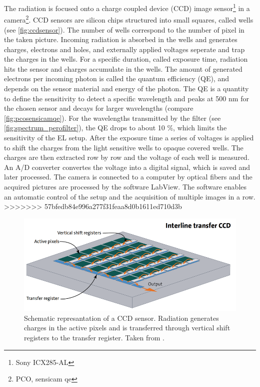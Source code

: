 The radiation is focused onto a charge coupled device (CCD) image sensor\footnote{Sony ICX285-AL} in a camera\footnote{PCO, sensicam qe}. CCD sensors are silicon chips structured into small squares, called wells \cite{SchnellCCD1993}(see \autoref{fig:ccdsensor}). The number of wells correspond to the number of pixel in the taken picture. Incoming radiation is absorbed in the wells and  generates charges, electrons and holes, and externally applied voltages seperate and trap the charges in the wells. For a specific duration, called exposure time, radiation hits the sensor and charges accumulate in the wells. The amount of generated electrons per incoming photon is called the quantum efficiency (QE), and depends on the sensor material and energy of the photon. The QE is a quantity to define the sensitivity to detect a specific wavelength and peaks at 500 nm for the chosen sensor and decays for larger wavelengths (compare \autoref{fig:pcosensicamqe}). For the wavelengths transmitted by the filter (see \autoref{fig:spectrum_perofilter}), the QE drops to about 10 \%, which limits the sensitivity of the EL setup. After the exposure time a series of voltages is applied to shift the charges from the light sensitive wells to opaque covered wells. The charges are then extracted row by row and the voltage of each well is measured. An A/D converter convertes the voltage into a digital signal, which is saved and later processed. The camera is connected to a computer by optical fibers and the acquired pictures are processed by the software LabView. The software enables an automatic control of the setup and the acquisition of multiple images in a row.
>>>>>>> 57bfedb84e996a277f31feaa8d0b1611ed710d3b
\begin{figure}
	\centering
	\includegraphics[width=\linewidth]{Images/ExperimentalSetup/ccd-sensor-interline-transfer-en}
	\caption{Schematic represantation of a CCD sensor. Radiation generates charges in the active pixels and is transferred through vertical shift registers to the transfer register. Taken from \cite{StemmerCCD}.}
	\label{fig:ccdsensor}
\end{figure}

